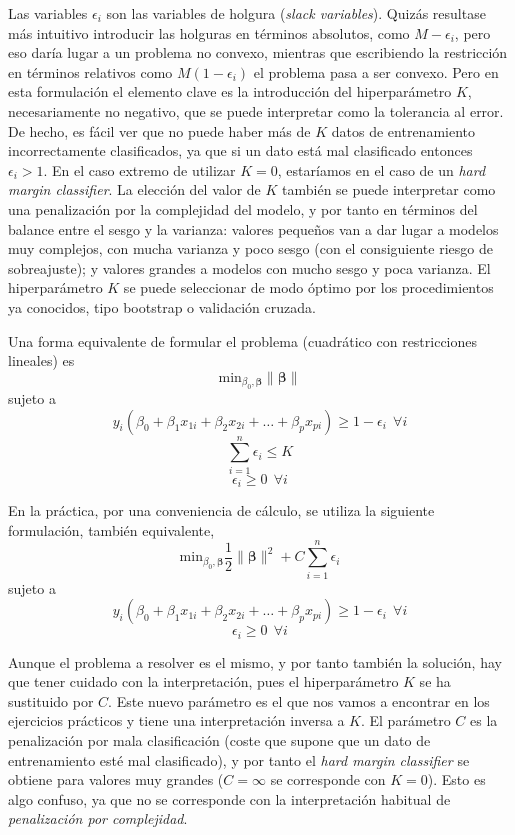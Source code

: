 \documentclass[
]{book}
\theoremstyle{break}
\theoremstyle{definition}
\theoremstyle{definition}
\theoremstyle{definition}
\theoremstyle{remark}
\begin{document}
Las variables \(\epsilon_i\) son las variables de holgura (\emph{slack variables}). Quizás resultase más intuitivo introducir las holguras en términos absolutos, como \(M -\epsilon_i\), pero eso daría lugar a un problema no convexo, mientras que escribiendo la restricción en términos relativos como \(M(1 - \epsilon_i)\) el problema pasa a ser convexo. Pero en esta formulación el elemento clave es la introducción del hiperparámetro \(K\), necesariamente no negativo, que se puede interpretar como la tolerancia al error. De hecho, es fácil ver que no puede haber más de \(K\) datos de entrenamiento incorrectamente clasificados, ya que si un dato está mal clasificado entonces \(\epsilon_i > 1\). En el caso extremo de utilizar \(K = 0\), estaríamos en el caso de un \emph{hard margin classifier}. La elección del valor de \(K\) también se puede interpretar como una penalización por la complejidad del modelo, y por tanto en términos del balance entre el sesgo y la varianza: valores pequeños van a dar lugar a modelos muy complejos, con mucha varianza y poco sesgo (con el consiguiente riesgo de sobreajuste); y valores grandes a modelos con mucho sesgo y poca varianza. El hiperparámetro \(K\) se puede seleccionar de modo óptimo por los procedimientos ya conocidos, tipo bootstrap o validación cruzada.

Una forma equivalente de formular el problema (cuadrático con restricciones lineales) es
\[\mbox{min}_{\beta_0, \boldsymbol{\beta}} \lVert \boldsymbol{\beta} \rVert\]
sujeto a
\[ y_i(\beta_0 + \beta_1 x_{1i} + \beta_2 x_{2i} + \ldots + \beta_p x_{pi}) \ge 1 - \epsilon_i \ \ \forall i\]
\[\sum_{i=1}^n \epsilon_i \le K\]
\[\epsilon_i \ge 0 \ \ \forall i\]

En la práctica, por una conveniencia de cálculo, se utiliza la siguiente formulación, también equivalente,
\[\mbox{min}_{\beta_0, \boldsymbol{\beta}} \frac{1}{2}\lVert \boldsymbol{\beta} \rVert^2 + C \sum_{i=1}^n \epsilon_i\]
sujeto a
\[ y_i(\beta_0 + \beta_1 x_{1i} + \beta_2 x_{2i} + \ldots + \beta_p x_{pi}) \ge 1 - \epsilon_i \ \ \forall i\]
\[\epsilon_i \ge 0 \ \ \forall i\]

Aunque el problema a resolver es el mismo, y por tanto también la solución, hay que tener cuidado con la interpretación, pues el hiperparámetro \(K\) se ha sustituido por \(C\). Este nuevo parámetro es el que nos vamos a encontrar en los ejercicios prácticos y tiene una interpretación inversa a \(K\). El parámetro \(C\) es la penalización por mala clasificación (coste que supone que un dato de entrenamiento esté mal clasificado), y por tanto el \emph{hard margin classifier} se obtiene para valores muy grandes (\(C = \infty\) se corresponde con \(K = 0\)). Esto es algo confuso, ya que no se corresponde con la interpretación habitual de \emph{penalización por complejidad}.
\end{document}
